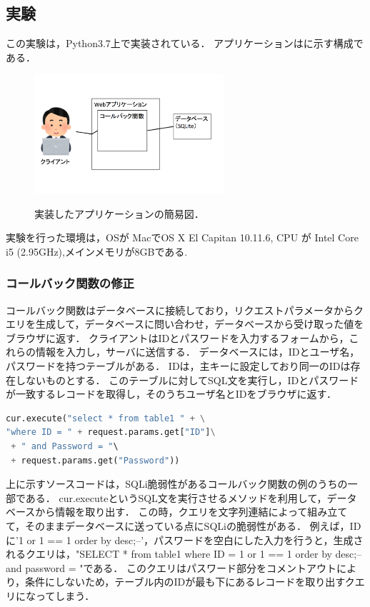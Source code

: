 \documentclass[submit]{ipsj}
\begin{document}
\subsection{実験}
この実験は，Python3.7上で実装されている．
アプリケーションはに示す構成である．
\begin{figure}[tb]
\begin{centering}
\includegraphics[width=7.0cm]{./figures/sys_strc.png}
\caption{実装したアプリケーションの簡易図．}
\label{fig:AppFig}
\end{centering}
\end{figure}
実験を行った環境は，OSが MacでOS X El Capitan 10.11.6, CPU が Intel Core i5 (2.95GHz),メインメモリが8GBである.

\subsubsection{コールバック関数の修正}
コールバック関数はデータベースに接続しており，リクエストパラメータからクエリを生成して，データベースに問い合わせ，データベースから受け取った値をブラウザに返す．
クライアントはIDとパスワードを入力するフォームから，これらの情報を入力し，サーバに送信する．
データベースには，IDとユーザ名，パスワードを持つテーブルがある．
IDは，主キーに設定しており同一のIDは存在しないものとする．
このテーブルに対してSQL文を実行し，IDとパスワードが一致するレコードを取得し，そのうちユーザ名とIDをブラウザに返す．

\begin{lstlisting}[language=python]
cur.execute("select * from table1 " + \
"where ID = " + request.params.get["ID"]\
 + " and Password = "\
 + request.params.get("Password"))
\end{lstlisting}

上に示すソースコードは，SQLi脆弱性があるコールバック関数の例のうちの一部である．
cur.executeというSQL文を実行させるメソッドを利用して，データベースから情報を取り出す．
この時，クエリを文字列連結によって組み立てて，そのままデータベースに送っている点にSQLiの脆弱性がある．
例えば，IDに'1 or 1 == 1 order by desc;--'，パスワードを空白にした入力を行うと，生成されるクエリは，"SELECT * from table1 where ID = 1 or 1 == 1 order by desc;-- and password = "である．
このクエリはパスワード部分をコメントアウトにより，条件にしないため，テーブル内のIDが最も下にあるレコードを取り出すクエリになってしまう．
\end{document}
